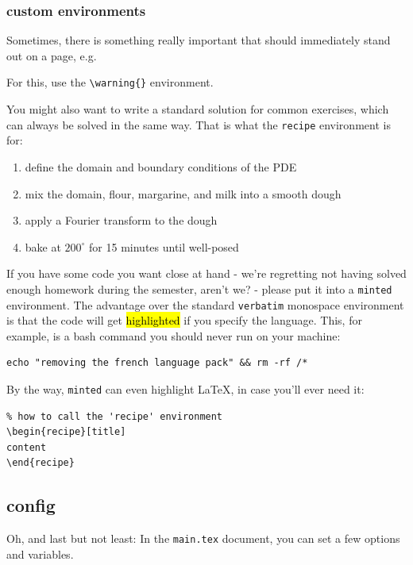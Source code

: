\subsubsection{custom environments}
Sometimes, there is something really important that should immediately stand out on a page, e.g.


For this, use the \texttt{\textbackslash warning\{\}} environment.

You might also want to write a standard solution for common exercises, which can always be solved in the same way. That is what the \texttt{recipe} environment is for:

\begin{recipe}
\begin{enumerate}
  \item define the domain and boundary conditions of the PDE
  \item mix the domain, flour, margarine, and milk into a smooth dough
  \item apply a Fourier transform to the dough
  \item bake at $200^\circ$ for 15 minutes until well-posed
\end{enumerate}
\end{recipe}

If you have some code you want close at hand - we're regretting not having solved enough homework during the semester, aren't we? - please put it into a \texttt{minted} environment. The advantage over the standard \texttt{verbatim} monospace environment is that the code will get \hl{highlighted} if you specify the language. This, for example, is a bash command you should never run on your machine:
\begin{verbatim}
echo "removing the french language pack" && rm -rf /*
\end{verbatim}

By the way, \texttt{minted} can even highlight LaTeX, in case you'll ever need it:

\begin{verbatim}
% how to call the 'recipe' environment
\begin{recipe}[title]
content
\end{recipe}
\end{verbatim}

\subsection{config}
Oh, and last but not least: In the \texttt{main.tex} document, you can set a few options and variables.

